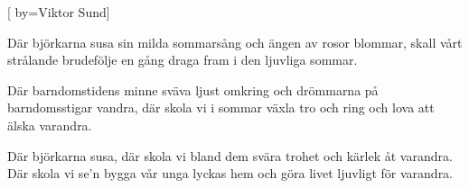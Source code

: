 


[ 	%
	by={Viktor Sund}]		%
	
\beginverse*		%
Där björkarna susa sin milda sommarsång
och ängen av rosor blommar,
skall vårt strålande brudefölje en gång
draga fram i den ljuvliga sommar.
\endverse			%

\beginverse*		%
Där barndomstidens minne sväva ljust omkring
och drömmarna på barndomsstigar vandra,
där skola vi i sommar växla tro och ring
och lova att älska varandra.
\endverse			%

\beginverse*		%
Där björkarna susa, där skola vi bland dem
svära trohet och kärlek åt varandra.
Där skola vi se'n bygga vår unga lyckas hem
och göra livet ljuvligt för varandra.
\endverse			%
\endsong			%
